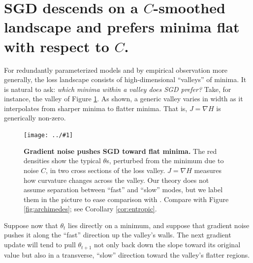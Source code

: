 \documentclass[openany, notitlepage, justified]{tufte-book}
\newcommand{\moolor}[2]{\par\hrulefill\\#2\vspace{#1 cm}\par\hrulefill\\}
\theoremstyle{plain}
\theoremstyle{definition}
\newcommand{\plotmoow}[3]{\texttt{[image: ../\#1]}}
\begin{document}
      
    \section{
        SGD descends on a $C$-smoothed landscape and prefers minima flat
        with respect to $C$.
    }

        For redundantly parameterized models and by empirical observation more
        generally, the loss landscape consists of high-dimensional
        ``valleys'' of minima.\cite[-1cm]{ch17, gu19}  It is natural to ask:
        \emph{which minima within a valley does SGD prefer?}  Take, for
        instance, the valley of Figure \ref{fig:cubic}.  As shown, a generic
        valley varies in width as it interpolates from sharper minima to
        flatter minima.  That is, $J=\nabla H$ is generically non-zero. 

        \begin{figure}
            \centering
            \plotmoow{diagrams/entropic-force-diagram}{0.5\columnwidth}{} 
            \caption{%
                \textbf{Gradient noise pushes SGD toward flat minima.} The
                red densities show the typical $\theta$s, perturbed from
                the minimum due to noise $C$, in two cross sections of the
                loss valley.  $J = \nabla H$ measures how curvature changes
                across the valley.  Our theory does not assume separation
                between ``fast'' and ``slow'' modes, but we label them in
                the picture to ease comparison with \citet{we19b}.  Compare
                with Figure \ref{fig:archimedes}; see Corollary
                \ref{cor:entropic}.
            }
            \label{fig:cubic}
        \end{figure}

        Suppose now that $\theta_t$ lies directly on a minimum, and suppose
        that gradient noise pushes it along the ``fast'' direction up the
        valley's walls.  The next gradient update will tend to pull
        $\theta_{t+1}$ not only back down the slope toward its original value
        but also in a transverse, ``slow'' direction toward the valley's
        flatter regions.
\end{document}
